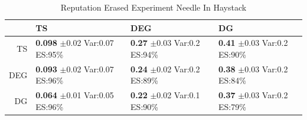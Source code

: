 \documentclass[11pt,letterpaper]{article}
\begin{document}
\begin{table}[H]
\centering
\caption{Reputation Erased Experiment Needle In Haystack} 
\begin{tabular}{rlll}
  \hline
 & TS & DEG &  DG \\ 
  \hline
TS & \makecell{\textbf{0.098} $\pm$0.02\\Var:0.07\\ES:95\%} & \makecell{\textbf{0.27} $\pm$0.03\\Var:0.2\\ES:94\%} & \makecell{\textbf{0.41} $\pm$0.03\\Var:0.2\\ES:90\%} \\ 
  DEG & \makecell{\textbf{0.093} $\pm$0.02\\Var:0.07\\ES:96\%} & \makecell{\textbf{0.24} $\pm$0.02\\Var:0.2\\ES:89\%} & \makecell{\textbf{0.38} $\pm$0.03\\Var:0.2\\ES:84\%} \\ 
   DG & \makecell{\textbf{0.064} $\pm$0.01\\Var:0.05\\ES:96\%} & \makecell{\textbf{0.22} $\pm$0.02\\Var:0.1\\ES:90\%} & \makecell{\textbf{0.37} $\pm$0.03\\Var:0.2\\ES:79\%} \\ 
   \hline
\end{tabular}
\end{table}
\end{document}
